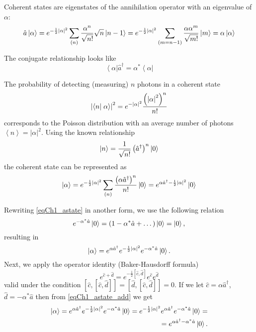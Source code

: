 Coherent states are eigenstates of the annihilation operator with an eigenvalue of $\alpha$:
\begin{equation}
\hat{a}\left|\alpha\right> = e^{-\frac{1}{2} \left|\alpha\right|^2}
\sum_{(n)} \frac{\alpha^n}{\sqrt{n!}}\sqrt{n}\ket{n - 1} = 
e^{-\frac{1}{2} \left|\alpha\right|^2}
\sum_{(m = n - 1)} \frac{\alpha \alpha^m}{\sqrt{m!}}\ket{m} = 
\alpha\left|\alpha\right>
\end{equation}

The conjugate relationship looks like
\begin{equation}
\left<\alpha\right|\hat{a}^{\dag} =  
\alpha^{*}\left<\alpha\right|
\end{equation}

The probability of detecting (measuring) $n$ photons in a coherent state
\begin{equation}
\left|\bra{n}\left.\alpha\right>\right|^2 =
e^{-\left|\alpha\right|^2}
\frac{\left(\left|\alpha\right|^2\right)^n}{n!}
\label{eqCh1_PuassonCoh}
\end{equation}
corresponds to the Poisson distribution
with an average number of photons  
$\left<n\right> = \left|\alpha\right|^2$. Using the known relationship 
\begin{equation}
\ket{n} = \frac{1}{\sqrt{n!}}
\left(\hat{a}^{\dag}\right)^n\ket{0}
\label{eqCh1_nstate}
\end{equation}
the coherent state can be represented as
\begin{equation}
\left|\alpha\right> = e^{-\frac{1}{2} \left|\alpha\right|^2}\sum_{(n)}
\frac{\left(\alpha \hat{a}^{\dag}\right)^n}{n!}\ket{0} = 
e^{\alpha \hat{a}^{\dag} -
  \frac{1}{2}\left|\alpha\right|^2}\ket{0}
\label{eqCh1_astate}
\end{equation}

Rewriting \eqref{eqCh1_astate} in another form, we use the following relation
\[
e^{- \alpha^{*} \hat{a}} \ket{0} = \left(1 - \alpha^{*} \hat{a} +
\dots\right) \ket{0} = \ket{0},
\]
resulting in
\begin{equation}
\left|\alpha\right> = 
e^{\alpha \hat{a}^{\dag}} 
e^{-\frac{1}{2}\left|\alpha\right|^2}
e^{- \alpha^{*} \hat{a}} 
\ket{0}.
\label{eqCh1_astate_add}
\end{equation}
Next, we apply the operator identity (Baker-Hausdorff formula)
\begin{equation}
e^{\hat{c} + \hat{d}} = e^{- \frac{1}{2}\left[\hat{c},
    \hat{d}\right]}e^{\hat{c}} e^{\hat{d}} 
\label{eqPart1Ch1_BeikerHausdorf}
\end{equation}
valid under the condition  
$\left[\hat{c},\left[\hat{c}, \hat{d}\right]\right] =
\left[\hat{d},\left[\hat{c}, \hat{d}\right]\right] = 0$.
If we let $\hat{c} = \alpha\hat{a}^{\dag}$, $\hat{d} = -\alpha^*\hat{a}$
then from \eqref{eqCh1_astate_add} we get 
\begin{eqnarray}
\left|\alpha\right> =  
e^{\alpha \hat{a}^{\dag}} 
e^{-\frac{1}{2}\left|\alpha\right|^2}
e^{- \alpha^{*} \hat{a}} 
\ket{0} =
e^{-\frac{1}{2}\left|\alpha\right|^2}
e^{\alpha \hat{a}^{\dag}} 
e^{- \alpha^{*} \hat{a}} 
\ket{0} = 
\nonumber \\
=
e^{\alpha \hat{a}^{\dag} - \alpha^{*} \hat{a}}\ket{0}.
\label{eqCh1_astate4squeezed}
\end{eqnarray}

